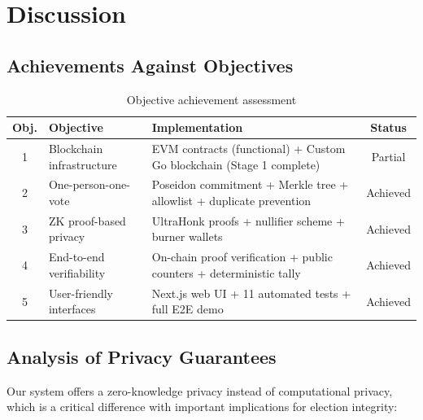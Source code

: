 \documentclass[12pt, a4paper]{report}
\begin{document}
\chapter{Discussion}

\section{Achievements Against Objectives}

\begin{table}[H]
\centering
\caption{Objective achievement assessment}
\label{tab:objectives_mapping}
\begin{tabular}{|c|p{4.5cm}|p{4.5cm}|c|}
\hline
\textbf{Obj.} & \textbf{Objective} & \textbf{Implementation} & \textbf{Status} \\ \hline
1 & Blockchain infrastructure & EVM contracts (functional) + Custom Go blockchain (Stage 1 complete) & Partial \\ \hline
2 & One-person-one-vote & Poseidon commitment + Merkle tree + allowlist + duplicate prevention & Achieved \\ \hline
3 & ZK proof-based privacy & UltraHonk proofs + nullifier scheme + burner wallets & Achieved \\ \hline
4 & End-to-end verifiability & On-chain proof verification + public counters + deterministic tally & Achieved \\ \hline
5 & User-friendly interfaces & Next.js web UI + 11 automated tests + full E2E demo & Achieved \\ \hline
\end{tabular}
\end{table}

\newpage
\section{Analysis of Privacy Guarantees}

Our system offers a zero-knowledge privacy instead of computational privacy, which is a critical difference with important implications for election integrity:
\end{document}
